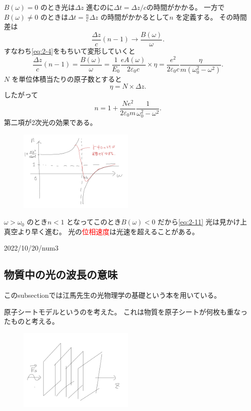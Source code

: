 \documentclass[dvipdfmx,12pt]{jsarticle}
\begin{document}
$B(\omega)=0$ のとき光は$\Delta z$ 進むのに$\Delta t=\Delta z /c$の時間がかかる。
一方で$B(\omega)\neq 0$ のときは$\Delta t= \frac{n}{c}\Delta z$ の時間がかかるとして$n$ を定義する。
その時間差は
\[
\frac{\Delta z}{c}(n-1)\to \frac{B(\omega)}{\omega}
.\] 
すなわち\eqref{eq:2-4}をもちいて変形していくと
\[
\frac{\Delta z}{c}(n-1)=\frac{B(\omega)}{\omega}=\frac{1}{E_0} \frac{eA(\omega)}{2\varepsilon_0 c}\times \eta=\frac{e^2}{2\varepsilon_0c}\frac{\eta}{m(\omega^2_0-\omega^2)}
.\] 
$N$ を単位体積当たりの原子数とすると
\[
\eta=N\times \Delta z
.\] 
したがって
\begin{equation}
\label{eq:2-12}
	n=1+\frac{Ne^2}{2\varepsilon_0m}\frac{1}{\omega_0^2-\omega^2}
.\end{equation}
第二項が2次光の効果である。
\begin{figure}[H]
	\centering
	\includegraphics[width=0.5\textwidth]{fig2/Fig-8.jpg}
	\label{fig:fig2-Fig-8-jpg}
\end{figure}
$\omega>\omega_0$ のとき$n<1$ となってこのとき$B(\omega)<0$ だから\eqref{eq:2-11}
光は見かけ上真空より早く進む。
光の\textcolor{red}{位相速度}は光速を超えることがある。

2022/10/20/num3

\subsection{物質中の光の波長の意味}
このsubsectionでは江馬先生の光物理学の基礎という本を用いている。


原子シートモデルというのを考えた。
これは物質を原子シートが何枚も重なったものと考える。
\begin{figure}[H]
	\centering
	\includegraphics[width=0.5\textwidth]{fig3/Fig-2.jpg}
	\label{fig:fig3-Fig-2-jpg}
\end{figure}
\end{document}
